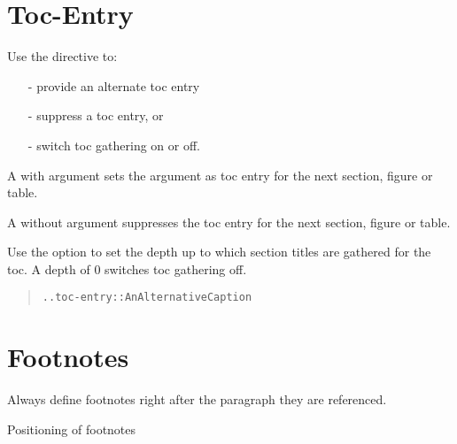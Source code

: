 \documentclass[a5paper]{book}
\begin{document}
\begin{german}
%
\label{toc-entry}%
\hypertarget{toc-entry}{}%
%
\section*{{\noindent}Toc-Entry}


Use the {} directive to:\par

\begin{itemize}
\item[-] 
provide an alternate toc entry\par

\item[-] 
suppress a toc entry, or\par

\item[-] 
switch toc gathering on or off.\par
\end{itemize}

A {} with argument sets the argument as toc entry
for the next section, figure or table.\par

A {} without argument suppresses the toc entry for
the next section, figure or table.\par

Use the {} option to set the depth up to which section
titles are gathered for the toc. A depth of 0 switches toc gathering
off.\par

\begin{quote}
\begin{alltt}
.. toc-entry:: An Alternative Caption
\end{alltt}
\end{quote}

%
\label{footnotes}%
\hypertarget{footnotes}{}%
%
\section*{Footnotes}


Always define footnotes right after the paragraph they are referenced.\par

\begin{table}[htbp]
\label{table-52}%
\hypertarget{table-52}{}%
\footnotesize
\begin{center}
\caption{Positioning of footnotes}




\end{center}
\end{table}
\end{german}
\end{document}
